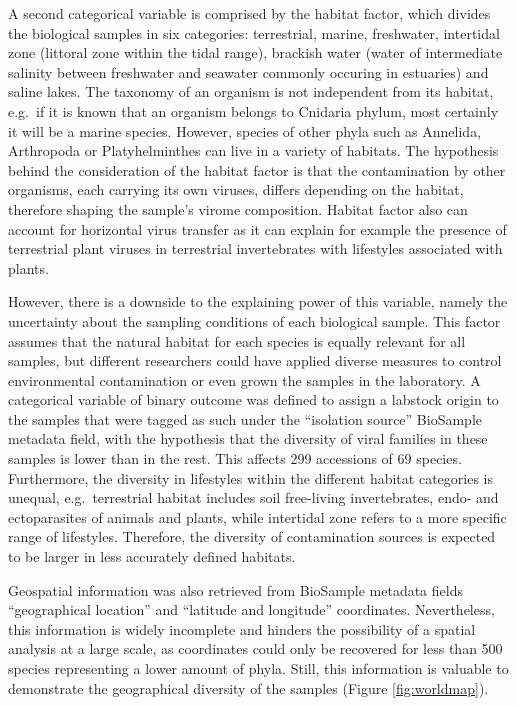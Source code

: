 \documentclass[
  openany]{book}
\begin{document}
A second categorical variable is comprised by the habitat factor, which divides the biological samples in six categories: terrestrial, marine, freshwater, intertidal zone (littoral zone within the tidal range), brackish water (water of intermediate salinity between freshwater and seawater commonly occuring in estuaries) and saline lakes. The taxonomy of an organism is not independent from its habitat, e.g.~if it is known that an organism belongs to Cnidaria phylum, most certainly it will be a marine species. However, species of other phyla such as Annelida, Arthropoda or Platyhelminthes can live in a variety of habitats. The hypothesis behind the consideration of the habitat factor is that the contamination by other organisms, each carrying its own viruses, differs depending on the habitat, therefore shaping the sample's virome composition. Habitat factor also can account for horizontal virus transfer as it can explain for example the presence of terrestrial plant viruses in terrestrial invertebrates with lifestyles associated with plants.

However, there is a downside to the explaining power of this variable, namely the uncertainty about the sampling conditions of each biological sample. This factor assumes that the natural habitat for each species is equally relevant for all samples, but different researchers could have applied diverse measures to control environmental contamination or even grown the samples in the laboratory. A categorical variable of binary outcome was defined to assign a labstock origin to the samples that were tagged as such under the ``isolation source'' BioSample metadata field, with the hypothesis that the diversity of viral families in these samples is lower than in the rest. This affects 299 accessions of 69 species. Furthermore, the diversity in lifestyles within the different habitat categories is unequal, e.g.~terrestrial habitat includes soil free-living invertebrates, endo- and ectoparasites of animals and plants, while intertidal zone refers to a more specific range of lifestyles. Therefore, the diversity of contamination sources is expected to be larger in less accurately defined habitats.

Geospatial information was also retrieved from BioSample metadata fields ``geographical location'' and ``latitude and longitude'' coordinates. Nevertheless, this information is widely incomplete and hinders the possibility of a spatial analysis at a large scale, as coordinates could only be recovered for less than 500 species representing a lower amount of phyla. Still, this information is valuable to demonstrate the geographical diversity of the samples (Figure \ref{fig:worldmap}).
\end{document}
